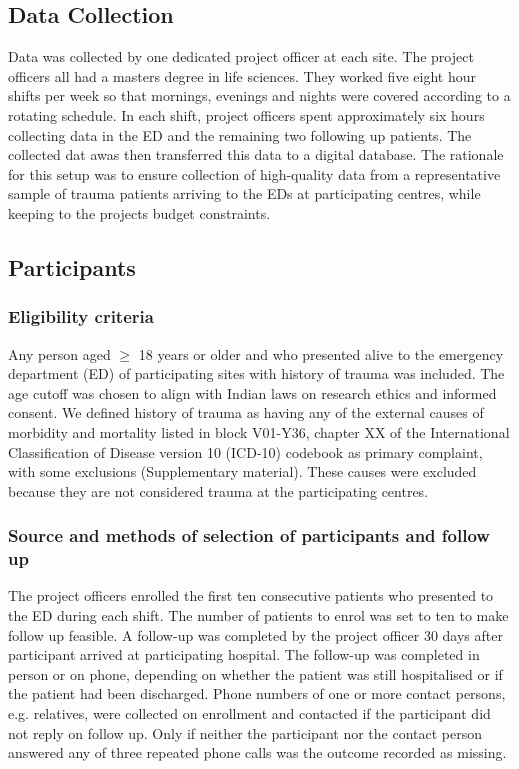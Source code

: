 \documentclass[10pt,letterpaper]{article}\usepackage[]{graphicx}\usepackage[]{color}
\begin{document}
\subsection*{Data Collection}
Data was collected by one dedicated project officer at each site. The project
officers all had a masters degree in life sciences. They worked five eight hour
shifts per week so that mornings, evenings and nights were covered according to
a rotating schedule. In each shift, project officers spent approximately six
hours collecting data in the ED and the remaining two following up patients. The
collected dat awas then transferred this data to a digital database. The
rationale for this setup was to ensure collection of high-quality data from a
representative sample of trauma patients arriving to the EDs at participating
centres, while keeping to the projects budget constraints.

\subsection*{Participants}
\subsubsection*{Eligibility criteria}
Any person aged $\geq$ 18 years or older and who presented alive to the
emergency department (ED) of participating sites with history of trauma was
included. The age cutoff was chosen to align with Indian laws on research ethics
and informed consent. We defined history of trauma as having any of the external
causes of morbidity and mortality listed in block V01-Y36, chapter XX of the
International Classification of Disease version 10 (ICD-10) codebook as primary
complaint, with some exclusions (Supplementary material). These causes were
excluded because they are not considered trauma at the participating centres.

\subsubsection*{Source and methods of selection of participants and follow up}
The project officers enrolled the first ten consecutive patients who presented
to the ED during each shift. The number of patients to enrol was set to ten to
make follow up feasible. A follow-up was completed by the project officer 30
days after participant arrived at participating hospital. The follow-up was
completed in person or on phone, depending on whether the patient was still
hospitalised or if the patient had been discharged. Phone numbers of one or more
contact persons, e.g. relatives, were collected on enrollment and contacted if
the participant did not reply on follow up. Only if neither the participant nor
the contact person answered any of three repeated phone calls was the outcome
recorded as missing.
\end{document}
